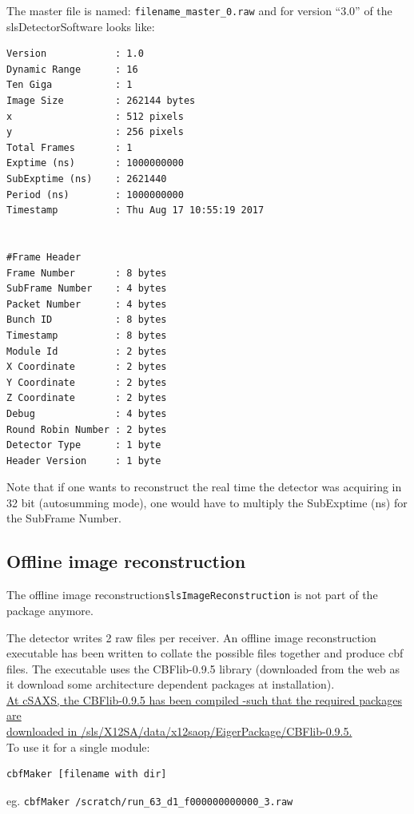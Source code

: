 \documentclass{article}
\begin{document}
The master file is named: {\tt{filename\_master\_0.raw}} and for version ``3.0'' of the slsDetectorSoftware looks like:
 
\begin{verbatim}
Version            : 1.0
Dynamic Range      : 16
Ten Giga           : 1
Image Size         : 262144 bytes
x                  : 512 pixels
y                  : 256 pixels
Total Frames       : 1
Exptime (ns)       : 1000000000
SubExptime (ns)    : 2621440
Period (ns)        : 1000000000
Timestamp          : Thu Aug 17 10:55:19 2017


#Frame Header
Frame Number       : 8 bytes
SubFrame Number    : 4 bytes
Packet Number      : 4 bytes
Bunch ID           : 8 bytes
Timestamp          : 8 bytes
Module Id          : 2 bytes
X Coordinate       : 2 bytes
Y Coordinate       : 2 bytes
Z Coordinate       : 2 bytes
Debug              : 4 bytes
Round Robin Number : 2 bytes
Detector Type      : 1 byte
Header Version     : 1 byte
\end{verbatim}

Note that if one wants to  reconstruct the real time the detector was acquiring in 32 bit (autosumming mode), one would have to multiply the SubExptime (ns) for the SubFrame Number. 

\subsection{Offline image reconstruction}
The offline image reconstruction{\tt{slsImageReconstruction}} is not part of the package anymore.

The detector writes 2 raw files per receiver. An offline image reconstruction executable has been written to collate the possible files together and produce cbf files. The executable uses the CBFlib-0.9.5 library (downloaded from the web as it download some architecture dependent packages at installation).\\
\underline{At cSAXS, the CBFlib-0.9.5 has been compiled -such that the required packages are}\\\underline{ downloaded in /sls/X12SA/data/x12saop/EigerPackage/CBFlib-0.9.5.}\\ 

To use it for a single module:
\begin{verbatim}
cbfMaker [filename with dir]
\end{verbatim}
eg.
{\tt{cbfMaker /scratch/run\_63\_d1\_f000000000000\_3.raw}}\\
\end{document}
